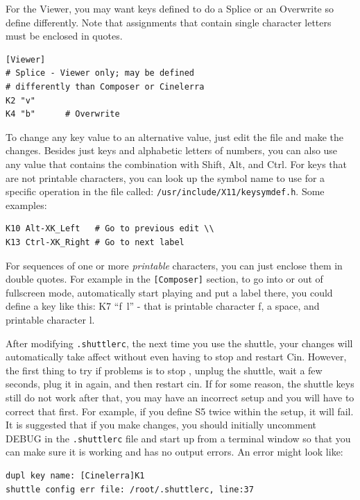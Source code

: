For the Viewer, you may want keys defined to do a Splice or an
Overwrite so define differently.  Note that assignments that contain
single character letters must be enclosed in quotes.

\begin{lstlisting}[style=sh]
[Viewer]
# Splice - Viewer only; may be defined
# differently than Composer or Cinelerra
K2 "v"
K4 "b"		# Overwrite
\end{lstlisting}

To change any key value to an alternative value, just edit the file
and make the changes.  Besides just keys and alphabetic letters of
numbers, you can also use any \CGG{} value that contains the
combination with Shift, Alt, and Ctrl.  For keys that are not
printable characters, you can look up the symbol name to use for a
specific operation in the file called:
\texttt{/usr/include/X11/keysymdef.h}. Some examples:

\begin{lstlisting}[style=sh]
K10 Alt-XK_Left	  # Go to previous edit \\
K13 Ctrl-XK_Right # Go to next label
\end{lstlisting}

For sequences of one or more \textit{printable} characters, you can
just enclose them in double quotes.  For example in the
\texttt{[Composer]} section, to go into or out of fullscreen mode,
automatically start playing and put a label there, you could define
a key like this:  K7 “f~l” - that is printable character f, a space,
and printable character l.

After modifying \texttt{.shuttlerc}, the next time you use the
shuttle, your changes will automatically take affect without even
having to stop and restart Cin.  However, the first thing to try if
problems is to stop \CGG{}, unplug the shuttle, wait a few seconds,
plug it in again, and then restart cin.  If for some reason, the
shuttle keys still do not work after that, you may have an incorrect
setup and you will have to correct that first.  For example, if you
define S5 twice within the \CGG{} setup, it will fail.  It is
suggested that if you make changes, you should initially uncomment
DEBUG in the \texttt{.shuttlerc} file and start up \CGG{} from a
terminal window so that you can make sure it is working and has no
output errors.  An error might look like:

\begin{lstlisting}[style=sh]
dupl key name: [Cinelerra]K1
shuttle config err file: /root/.shuttlerc, line:37
\end{lstlisting}

